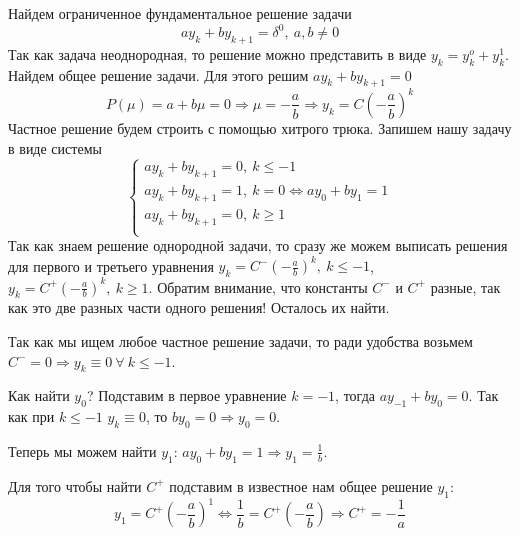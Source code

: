 \begin{example}
  Найдем ограниченное фундаментальное решение задачи
  \[ay_k+by_{k+1}=\delta^0,\ a,b\neq0\]
  Так как задача неоднородная, то решение можно представить в виде
  $y_k=y_k^o+y_k^1$.
  Найдем общее решение задачи. Для этого решим $ay_k+by_{k+1}=0$
  \[P(\mu)=a+b\mu=0\Rightarrow\mu=-\frac{a}{b}\Rightarrow y_k=C\left(-\frac{a}{b}\right)^k\]
  Частное решение будем строить с помощью хитрого трюка. Запишем
  нашу задачу в виде системы
  \[\begin{cases}
      ay_k+by_{k+1}=0,\ k\leq -1                           \\
      ay_k+by_{k+1}=1,\ k =  0 \Leftrightarrow ay_0+by_1=1 \\
      ay_k+by_{k+1}=0,\ k \geq 1                           \\
    \end{cases}\]
  Так как знаем решение однородной задачи, то сразу
  же можем выписать решения для первого и третьего уравнения
  $y_k=C^-\left(-\frac{a}{b}\right)^k,\ k\leq -1$,
  $y_k=C^+\left(-\frac{a}{b}\right)^k,\ k\geq 1$.
  Обратим внимание, что константы $C^-$ и $C^+$ разные,
  так как это две разных части одного решения! Осталось их найти.

  Так как мы ищем любое частное решение задачи,
  то ради удобства возьмем $C^-=0\Rightarrow y_k\equiv 0\ \forall\ k\leq-1$.

  Как найти $y_0$? Подставим в первое уравнение $k=-1$, тогда
  $ay_{-1}+by_0=0$. Так как при $k\leq-1$ $y_k\equiv0$, то
  $by_0=0\Rightarrow y_0=0$.

  Теперь мы можем найти $y_1$: $ay_0+by_1=1\Rightarrow y_1=\frac{1}{b}$.

  Для того чтобы найти $C^+$ подставим
  в известное нам общее решение $y_1$:
  \[y_1=C^+\left(-\frac{a}{b}\right)^1\Leftrightarrow\frac{1}{b}=C^+\left(-\frac{a}{b}\right)\Rightarrow C^+=-\frac{1}{a}\]


\end{example}

